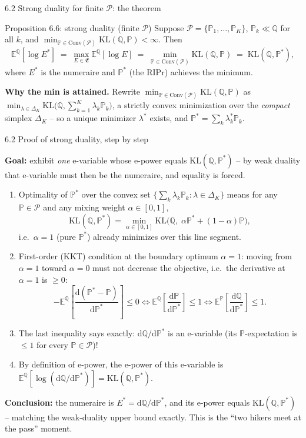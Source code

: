 \documentclass[aspectratio=169,10pt]{beamer}
\newcommand{\bE}{\mathbb{E}}
\newcommand{\bP}{\mathbb{P}}
\newcommand{\bQ}{\mathbb{Q}}
\newcommand{\cP}{\mathcal{P}}
\newcommand{\cE}{\mathfrak{E}}
\newcommand{\Conv}{\mathrm{Conv}}
\newcommand{\KL}{\mathrm{KL}}
\begin{document}
\begin{frame}{6.2 Strong duality for finite $\cP$: the theorem}

\begin{block}{Proposition 6.6: strong duality (finite $\cP$)}
Suppose $\cP = \{\bP_1,\dots,\bP_K\}$, $\bP_k \ll \bQ$ for all $k$, and
$\min_{\bP \in \Conv(\cP)}\KL(\bQ,\bP) < \infty$. Then
\[
\bE^{\bQ}[\log E^*] \;=\; \max_{E\in\cE} \bE^{\bQ}[\log E]
\;=\; \min_{\bP \in \Conv(\cP)} \KL(\bQ,\bP) \;=\; \KL(\bQ,\bP^*),
\]
where $E^*$ is the numeraire and $\bP^*$ (the RIPr) achieves the
minimum.
\end{block}

\textbf{Why the min is attained.} Rewrite $\min_{\bP\in\Conv(\cP)}\KL(\bQ,\bP)$
as $\min_{\lambda \in \Delta_K} \KL\!\big(\bQ, \sum_{k=1}^K \lambda_k \bP_k\big)$,
a strictly convex minimization over the \emph{compact} simplex
$\Delta_K$ -- so a unique minimizer $\lambda^*$ exists, and
$\bP^* = \sum_k \lambda_k^* \bP_k$.
\end{frame}

\begin{frame}{6.2 Proof of strong duality, step by step}

\textbf{Goal:} exhibit \emph{one} e-variable whose e-power equals
$\KL(\bQ,\bP^*)$ -- by weak duality that e-variable must then be the
numeraire, and equality is forced.

\begin{enumerate}
\item Optimality of $\bP^*$ over the convex set
$\{\sum_k \lambda_k \bP_k : \lambda \in \Delta_K\}$ means for any
$\bP \in \cP$ and any mixing weight $\alpha \in [0,1]$,
\[
\KL(\bQ,\bP^*) = \min_{\alpha \in [0,1]} \KL\big(\bQ,\; \alpha \bP^* + (1-\alpha)\bP\big),
\]
i.e.\ $\alpha=1$ (pure $\bP^*$) already minimizes over this line segment.
\item First-order (KKT) condition at the boundary optimum $\alpha=1$:
moving from $\alpha=1$ toward $\alpha=0$ must not decrease the
objective, i.e.\ the derivative at $\alpha=1$ is $\ge 0$:
\[
-\bE^{\bQ}\!\left[\frac{\mathrm{d}(\bP^*-\bP)}{\mathrm{d}\bP^*}\right] \le 0
\iff
\bE^{\bQ}\!\left[\frac{\mathrm{d}\bP}{\mathrm{d}\bP^*}\right] \le 1
\iff
\bE^{\bP}\!\left[\frac{\mathrm{d}\bQ}{\mathrm{d}\bP^*}\right] \le 1.
\]
\item The last inequality says exactly: $\mathrm{d}\bQ/\mathrm{d}\bP^*$
is an e-variable (its $\bP$-expectation is $\le 1$ for every $\bP\in\cP$)!
\item By definition of e-power, the e-power of this e-variable is
$\bE^{\bQ}[\log(\mathrm{d}\bQ/\mathrm{d}\bP^*)] = \KL(\bQ,\bP^*)$.
\end{enumerate}
\textbf{Conclusion:} the numeraire is $E^* = \mathrm{d}\bQ/\mathrm{d}\bP^*$,
and its e-power equals $\KL(\bQ,\bP^*)$ -- matching the weak-duality
upper bound exactly. This is the ``two hikers meet at the pass'' moment.
\end{frame}
\end{document}
